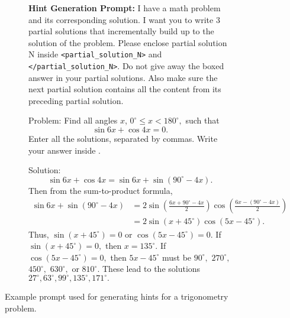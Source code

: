 \begin{figure}[h]
\begin{subfigure}{\linewidth}
\begin{tcolorbox}[colback=blue!5!white,colframe=mybrown!75!black]
\begin{small}
\textbf{Hint Generation Prompt:}
I have a math problem and its corresponding solution. I want you to write 3 partial solutions that incrementally build up to the solution of the problem.
Please enclose partial solution N inside \texttt{<partial\_solution\_N>} and \texttt{</partial\_solution\_N>}. Do not give away the boxed answer in your partial solutions. Also make sure the next partial solution contains all the content from its preceding partial solution.

Problem:
Find all angles $x$, $0^\circ \le x < 180^\circ,$ such that \[\sin 6x + \cos 4x = 0.\] Enter all the solutions, separated by commas. Write your answer inside \boxed{}.

Solution:
\[\sin 6x + \cos 4x = \sin 6x + \sin (90^\circ - 4x).\]Then from the sum-to-product formula,
\begin{align*}
\sin 6x + \sin (90^\circ - 4x) &= 2 \sin \left( \frac{6x + 90^\circ - 4x}{2} \right) \cos \left( \frac{6x - (90^\circ - 4x)}{2} \right) \\
&= 2 \sin (x + 45^\circ) \cos (5x - 45^\circ).
\end{align*}Thus, $\sin (x + 45^\circ) = 0$ or $\cos (5x - 45^\circ) = 0.$
If $\sin (x + 45^\circ) = 0,$ then $x = 135^\circ.$
If $\cos (5x - 45^\circ) = 0,$ then $5x - 45^\circ$ must be $90^\circ,$ $270^\circ,$ $450^\circ,$ $630^\circ,$ or $810^\circ.$  These lead to the solutions $\boxed{27^\circ, 63^\circ, 99^\circ, 135^\circ, 171^\circ}.$
\end{small}
\end{tcolorbox}
\end{subfigure}\hfill
\caption{Example prompt used for generating hints for a trigonometry problem.}
\label{fig:example_hint_generation}
\end{figure}



